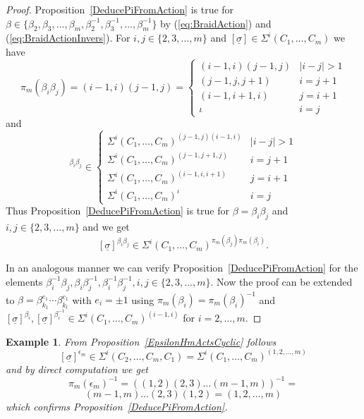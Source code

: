 \documentclass[12pt,a4paper]{article}
\newtheorem{example}{Example}[section]
\numberwithin{equation}{section}
\numberwithin{table}{section}
\begin{document}
\begin{proof}
Proposition~\ref{DeducePiFromAction} is true for 
$\beta \in \{ \beta_2,\beta_3,\dots,\beta_m,\beta_2^{-1},\beta_3^{-1},\dots,\beta_m^{-1}  \}$
by (\ref{eq:BraidAction}) and (\ref{eq:BraidActionInvers}).
For $i,j \in \{ 2,3,\dots,m \}$ and $[\underline{\sigma}] \in \Sigma^i(C_1,\dots, C_m)$ we have
\begin{equation}
\pi_m(\beta_i \beta_j) = (i-1,i)(j-1,j) =
\begin{cases}
(i-1,i)(j-1,j) & |i-j| > 1 \\
(j-1,j,j+1) & i = j+1 \\
(i-1,i+1,i) & j = i+1 \\
\iota & i = j
\end{cases}
\end{equation}
and
\begin{equation}
[\underline{\sigma}]^{\beta_i \beta_j} \in
\begin{cases}
\Sigma^i(C_1,\dots, C_m)^{(j-1,j)(i-1,i)} & |i-j| > 1 \\
\Sigma^i(C_1,\dots, C_m)^{(j-1,j+1,j)} & i = j+1 \\
\Sigma^i(C_1,\dots, C_m)^{(i-1,i,i+1)} & j = i+1 \\
\Sigma^i(C_1,\dots, C_m)^{\iota} & i = j
\end{cases}
\end{equation}
Thus Proposition~\ref{DeducePiFromAction} is true for $\beta = \beta_i \beta_j$ and $i,j \in \{ 2,3,\dots,m \}$
and we get
$$[\underline{\sigma}]^{\beta_i \beta_j} \in \Sigma^i(C_1,\dots, C_m)^{\pi_m(\beta_j)\pi_m(\beta_i)}.$$
\par
\noindent
In an analogous manner we can verify Proposition~\ref{DeducePiFromAction} for the elements
$\beta_i^{-1} \beta_j, \beta_i \beta_j^{-1}, \beta_i^{-1} \beta_j^{-1}, i,j \in \{ 2,3,\dots,m \}$.
Now the proof can be extended to
$\beta = \beta_{k_1}^{e_1} \cdots \beta_{k_l}^{e_1}$ with $e_i = \pm 1$
using $\pi_m(\beta_i) = \pi_m(\beta_i)^{-1}$ and
$[\underline{\sigma}]^{\beta_i}, [\underline{\sigma}]^{\beta_i^{-1}} \in \Sigma^i(C_1,\dots, C_m)^{(i-1,i)}$
for $i=2,\dots,m$.
\end{proof}
%
\begin{example}
\label{DeducePiFromActionForEpsilon}
From Proposition~\ref{EpsilonHmActsCyclic} follows
$$[\underline{\sigma}]^{\epsilon_m} \in \Sigma^i(C_2,\dots, C_m,C_1) = 
\Sigma^i(C_1,\dots, C_m)^{(1,2,\dots,m)}$$
and by direct computation we get
$$\pi_m(\epsilon_m)^{-1} = ((1,2)(2,3)\dots(m-1,m))^{-1} = $$
$$(m-1,m)\dots(2,3)(1,2) = (1,2,\dots,m)$$
which confirms Proposition~\ref{DeducePiFromAction}.
\end{example}
\end{document}
